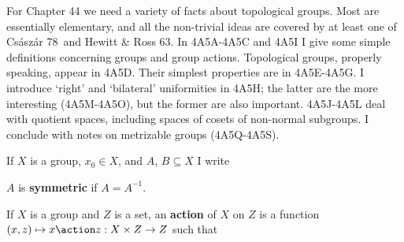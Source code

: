 
\def\chaptername{Appendix}
\def\sectionname{Topological groups}

\def\Csaszar{{\smc Cs\'asz\'ar 78}}
\def\Folland{{\smc Folland 95}}
\def\HR{{\smc Hewitt \& Ross 63}}
\def\rti{right-{\vthsp}translation-{\vthsp}invariant}


For Chapter 44 we need a variety of facts about topological groups.
Most are essentially elementary, and all the non-trivial ideas are covered
by at least one of \Csaszar\ and \HR.   In
4A5A-4A5C %
and 4A5I I give some simple definitions concerning groups and group
actions.   Topological groups, properly speaking, appear in 4A5D.
Their simplest properties are in 4A5E-4A5G. %
I introduce `right' and `bilateral' uniformities in 4A5H;  the latter
are the more interesting (4A5M-4A5O),  %
but the former are also important.
4A5J-4A5L %
deal with quotient spaces, including spaces of cosets of
non-normal subgroups.   I conclude with notes on metrizable groups
(4A5Q-4A5S).  %


 If $X$ is a group, $x_0\in X$, and $A$,
$B\subseteq X$ I write



\noindent $A$ is {\bf symmetric} if $A=A^{-1}$.

 If $X$ is a group and $Z$ is a set, an
{\bf action} of $X$ on $Z$ is a function
$(x,z)\mapsto x\action z:X\times Z\to Z$ such that


